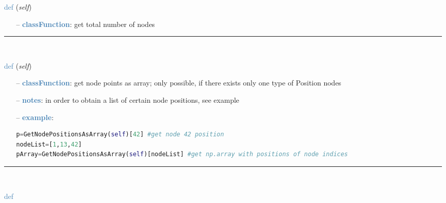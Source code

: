 \begin{itemize}[leftmargin=1.4cm]
\begin{itemize}[leftmargin=0.5cm]
\begin{itemize}[leftmargin=1.4cm]
\begin{itemize}[leftmargin=1.4cm]
\begin{itemize}[leftmargin=0.5cm]
\begin{flushleft}
\noindent \textcolor{steelblue}{def {\bf {}}}\label{sec:FEM:FEMinterface:NumberOfNodes}
({\it self})
\end{flushleft}
\setlength{\itemindent}{0.7cm}
\begin{itemize}[leftmargin=0.7cm]
  \item[--]  \textcolor{steelblue}{\bf classFunction}: get total number of nodes\vspace{12pt}\end{itemize}
%
\noindent\rule{8cm}{0.75pt}\vspace{1pt} \\ 
\begin{flushleft}
\noindent \textcolor{steelblue}{def {\bf {}}}\label{sec:FEM:FEMinterface:GetNodePositionsAsArray}
({\it self})
\end{flushleft}
\setlength{\itemindent}{0.7cm}
\begin{itemize}[leftmargin=0.7cm]
  \item[--]  \textcolor{steelblue}{\bf classFunction}: get node points as array; only possible, if there exists only one type of Position nodes  \item[--]  \textcolor{steelblue}{\bf notes}: in order to obtain a list of certain node positions, see example  \item[--]  \textcolor{steelblue}{\bf example}: \vspace{-12pt}\ei\begin{lstlisting}[language=Python, xleftmargin=36pt]
p=GetNodePositionsAsArray(self)[42] #get node 42 position
nodeList=[1,13,42]
pArray=GetNodePositionsAsArray(self)[nodeList] #get np.array with positions of node indices\end{lstlisting}\vspace{-24pt}\bi\item[]\vspace{-24pt}\vspace{12pt}\end{itemize}
%
\noindent\rule{8cm}{0.75pt}\vspace{1pt} \\ 
\begin{flushleft}
\noindent \textcolor{steelblue}{def {\bf {}}}\label{sec:FEM:FEMinterface:GetNodePositionsMean}

\end{flushleft}
\end{itemize}
\end{itemize}
\end{itemize}
\end{itemize}
\end{itemize}
